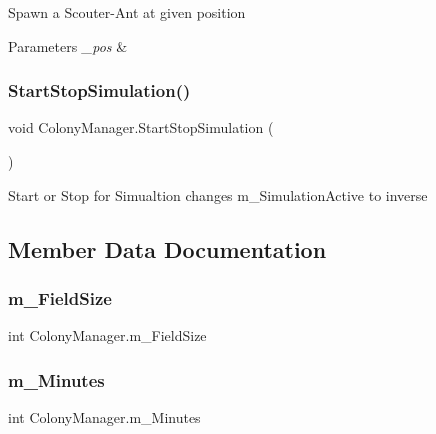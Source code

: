 Spawn a Scouter-\/\+Ant at given position 


\begin{DoxyParams}{Parameters}
{\em \+\_\+pos} & \\
\hline
\end{DoxyParams}
\mbox{\label{class_colony_manager_a839590052f5e40b36f4902a7f76c1fd0}} 
\subsubsection{\texorpdfstring{StartStopSimulation()}{StartStopSimulation()}}
{\footnotesize\ttfamily void Colony\+Manager.\+Start\+Stop\+Simulation (\begin{DoxyParamCaption}{ }\end{DoxyParamCaption})}



Start or Stop for Simualtion changes m\+\_\+\+Simulation\+Active to inverse 



\subsection{Member Data Documentation}
\mbox{\label{class_colony_manager_a4c0db188b26b046e2eaf3d6301b0a220}} 
\subsubsection{\texorpdfstring{m\_FieldSize}{m\_FieldSize}}
{\footnotesize\ttfamily int Colony\+Manager.\+m\+\_\+\+Field\+Size}

\mbox{\label{class_colony_manager_a7449b4e922fd4c73fe921bb10f2e425b}} 
\subsubsection{\texorpdfstring{m\_Minutes}{m\_Minutes}}
{\footnotesize\ttfamily int Colony\+Manager.\+m\+\_\+\+Minutes}

